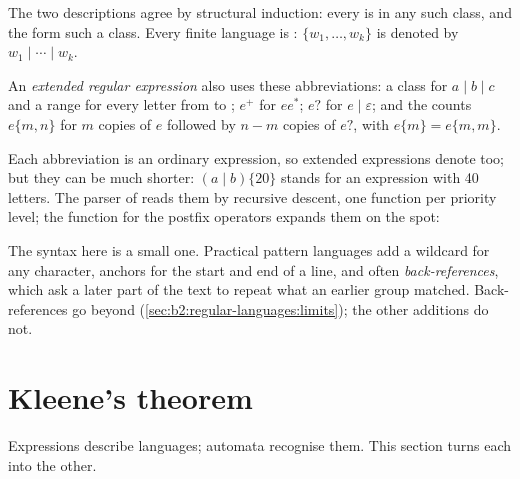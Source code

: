 The two descriptions agree by structural induction: every  is in any such class, and the  form such a class. Every finite language is : $\{w_1, \dots, w_k\}$ is denoted by $w_1 \mid \cdots
\mid w_k$.

\begin{definition}\label{def:b2:regular-languages:extended}
An \emph{extended regular expression} also uses these abbreviations: a class
\code{[abc]} for $a \mid b \mid c$ and a range \code{[a-z]} for every letter from  to ; $e^+$ for
$ee^*$; $e?$ for $e \mid \varepsilon$; and the counts $e\{m,n\}$ for $m$ copies of $e$ followed by $n - m$ copies of
$e?$, with $e\{m\} = e\{m,m\}$.
\end{definition}

Each abbreviation is an ordinary expression, so extended expressions denote  too; but they can be
much shorter: $(a \mid b)\{20\}$ stands for an expression with 40 letters. The parser of  reads them by
recursive descent, one function per priority level; the function for the postfix operators expands them on the spot:

\label{lst:b2:regular-languages:post}

The syntax here is a small one. Practical pattern languages add a wildcard for any character, anchors for the start
and end of a line, and often \emph{back-references}, which ask a later part of the text to repeat what an earlier
group matched. Back-references go beyond  (\cref{sec:b2:regular-languages:limits}); the other
additions do not.

\section{Kleene's theorem}\label{sec:b2:regular-languages:kleene}

Expressions describe languages; automata recognise them. This section turns each into the other.

